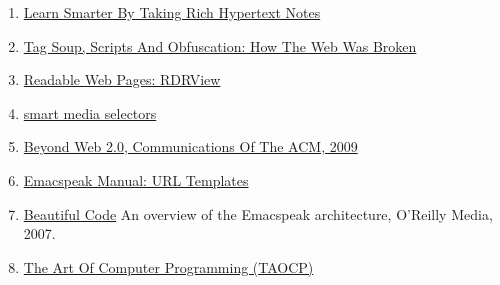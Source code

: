 \documentclass[11pt]{article}
\begin{document}
\begin{enumerate}
\item \href{https://emacspeak.blogspot.com/2022/10/learn-smarter-by-taking-rich-hypertext.html}{Learn Smarter By Taking Rich Hypertext Notes}
\item \href{https://idlewords.com/talks/website\_obesity.htm}{Tag Soup, Scripts And Obfuscation: How The Web Was Broken}
\item \href{https://github.com/eafer/rdrview}{Readable Web Pages: RDRView}
\item \href{https://emacspeak.blogspot.com/2024/03/updated-smart-media-selector-for-audio.html}{smart media selectors}
\item \href{https://research.google/blog/beyond-web-20/?hl=in\&m=1}{Beyond Web 2.0, Communications Of The ACM, 2009}
\item \href{https://tvraman.github.io/emacspeak/manual/URL-Templates.html}{Emacspeak Manual: URL Templates}
\item \href{http://emacspeak.blogspot.com/2007/07/emacspeak-and-beautiful-code.html}{Beautiful Code}   An overview of the Emacspeak architecture, O'Reilly Media, 2007.
\item \href{https://www-cs-faculty.stanford.edu/\~knuth/taocp.html}{The Art Of Computer Programming (TAOCP)}
\end{enumerate}
\end{document}
